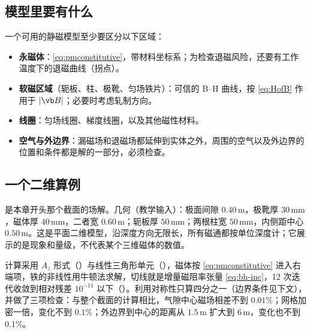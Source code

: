 \subsection{模型里要有什么}
一个可用的静磁模型至少要区分以下区域：
\begin{itemize}
\item \textbf{永磁体}：\eqref{eq:pmconstitutive}，带材料坐标系；为检查退磁风险，还要有工作温度下的退磁曲线（拐点）。
\item \textbf{软磁区域}（轭板、柱、极靴、匀场铁片）：可信的 B--H 曲线，按 \eqref{eq:HofB} 作用于 $|\vb B|$；必要时考虑轧制方向。
\item \textbf{线圈}：匀场线圈、梯度线圈，以及其他磁性材料。
\item \textbf{空气与外边界}：漏磁场和退磁场都延伸到实体之外，周围的空气以及外边界的位置和条件都是解的一部分，必须检查。
\end{itemize}

\subsection{一个二维算例}
 是本章开头那个截面的场解。几何（教学输入）：极面间隙 $0.40\,\mathrm m$，极靴厚 $30\,\mathrm{mm}$，磁体厚 $40\,\mathrm{mm}$，二者宽 $0.60\,\mathrm m$；轭板厚 $50\,\mathrm{mm}$；两根柱宽 $50\,\mathrm{mm}$，内侧距中心 $0.50\,\mathrm m$。这是平面二维模型，沿深度方向无限长，所有磁通都按单位深度计；它展示的是现象和量级，不代表某个三维磁体的数值。

计算采用 $A_z$ 形式（）与线性三角形单元（），磁体按 \eqref{eq:pmconstitutive} 进入右端项，铁的非线性用牛顿法求解，切线就是增量磁阻率张量 \eqref{eq:bh-inc}，12 次迭代收敛到相对残差 $10^{-11}$ 以下（）。利用对称性只算四分之一（边界条件见下文），并做了三项检查：与整个截面的计算相比，气隙中心磁场相差不到 $0.01\%$；网格加密一倍，变化不到 $0.1\%$；外边界到中心的距离从 $1.5\,\mathrm m$ 扩大到 $6\,\mathrm m$，变化也不到 $0.1\%$。



